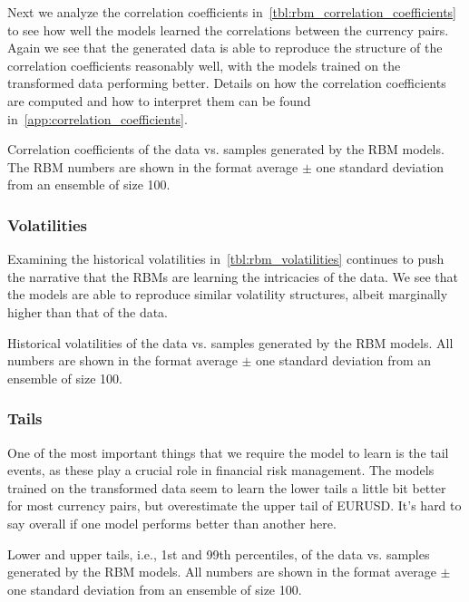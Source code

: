 Next we analyze the correlation coefficients in~\cref{tbl:rbm_correlation_coefficients} to see how well the models learned the correlations between the currency pairs.
Again we see that the generated data is able to reproduce the structure of the correlation coefficients reasonably well, with the models trained on the transformed data performing better.
Details on how the correlation coefficients are computed and how to interpret them can be found in~\cref{app:correlation_coefficients}.
\begin{table}[!htb]
    \centering
    \begin{adjustbox}{max width=\textwidth}
        
    \end{adjustbox}
    \caption{Correlation coefficients of the data vs. samples generated by the RBM models. The RBM numbers are shown in the format average \(\pm\) one standard deviation from an ensemble of size 100.}
    \label{tbl:rbm_correlation_coefficients}
\end{table}

\subsubsection{Volatilities}
Examining the historical volatilities in~\cref{tbl:rbm_volatilities} continues to push the narrative that the RBMs are learning the intricacies of the data.
We see that the models are able to reproduce similar volatility structures, albeit marginally higher than that of the data.
\begin{table}[!htb]
    \centering
    \begin{adjustbox}{max width=\textwidth}
        
    \end{adjustbox}
    \caption{Historical volatilities of the data vs. samples generated by the RBM models. All numbers are shown in the format average \(\pm\) one standard deviation from an ensemble of size 100.}
    \label{tbl:rbm_volatilities}
\end{table}

\subsubsection{Tails}
One of the most important things that we require the model to learn is the tail events, as these play a crucial role in financial risk management.
The models trained on the transformed data seem to learn the lower tails a little bit better for most currency pairs, but overestimate the upper tail of EURUSD.
It's hard to say overall if one model performs better than another here.
\begin{table}[!htb]
    \centering
    \begin{adjustbox}{max width=\textwidth}
        
    \end{adjustbox}
    \caption{Lower and upper tails, i.e., 1st and 99th percentiles, of the data vs. samples generated by the RBM models. All numbers are shown in the format average \(\pm\) one standard deviation from an ensemble of size 100.}
    \label{tbl:rbm_tails}
\end{table}

